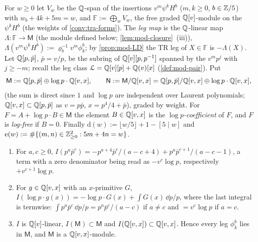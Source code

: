 \begin{defn}
\label{def:mod-weights}
For $w\geq 0$ let $V_w$ be the $\mathbb{Q}$-span of the insertions $v^m\psi^kH^b$ ($m,k\geq 0$, $b\in\mathbb{Z}/5$) with $w_b+4k+5m=w$, and $\mathbb F:=\bigoplus_wV_w$, the free graded $\mathbb{Q}[v]$-module on the $\psi^kH^b$ (the weights of \cref{conv:tra-forms}). The \emph{leg map} is the $\mathbb{Q}$-linear map $\Lambda\colon\mathbb F\to\mathsf M$ (the module defined below; \cref{lem:mod-closure}~(iii)), $\Lambda(v^m\psi^kH^b):=\varrho_b^{-1}v^m\phi^b_k$; by \cref{prop:mod-LD} the TR leg of $X\in\mathbb F$ is $-\Lambda(X)$. Let $\mathbb{Q}[p,\bar p]$, $\bar p=v/p$, be the subring of $\mathbb{Q}[v][p,p^{-1}]$ spanned by the $v^mp^j$ with $j\geq -m$; recall the leg class $\mathcal{L}=\mathbb{Q}[v][p]+\mathbb{Q}(v)[x]$ (\cref{def:mod-pair}). Put
\[
\mathsf M:=\mathbb{Q}[p,\bar p]\oplus\log p\cdot\mathbb{Q}[v,x],\qquad \mathsf N:=\mathsf M/\mathbb{Q}[v,x]=\mathbb{Q}[p,\bar p]/\mathbb{Q}[v,x]\oplus\log p\cdot\mathbb{Q}[v,x],
\]
(the sum is direct since $1$ and $\log p$ are independent over Laurent polynomials; $\mathbb{Q}[v,x]\subset\mathbb{Q}[p,\bar p]$ as $v=p\bar p$, $x=p^4/4+\bar p$), graded by weight. For $F=A+\log p\cdot B\in\mathsf M$ the element $B\in\mathbb{Q}[v,x]$ is the \emph{$\log p$-coefficient} of $F$, and $F$ is \emph{log-free} if $B=0$. Finally $\mathrm d(w):=\lfloor w/5\rfloor+1-[5\mid w]$ and $\mathrm e(w):=\#\{(m,n)\in\mathbb{Z}_{\geq 0}^2: 5m+4n=w\}$.
\end{defn}

\begin{lem}[Closure]
\label{lem:mod-closure}
\begin{enumerate}
\item For $a,c\geq 0$, $I(p^a\bar p^c)=-p^{a+4}\bar p^c/(a-c+4)+p^a\bar p^{c+1}/(a-c-1)$, a term with a zero denominator being read as $-v^c\log p$, respectively $+v^{c+1}\log p$.
\item For $g\in\mathbb{Q}[v,x]$ with an $x$-primitive $G$, $I(\log p\cdot g(x))=-\log p\cdot G(x)+\int G(x)\,\dd p/p$, where the last integral is termwise: $\int p^a\bar p^c\,\dd p/p=p^a\bar p^c/(a-c)$ if $a\neq c$ and $=v^c\log p$ if $a=c$.
\item $I$ is $\mathbb{Q}[v]$-linear, $I(\mathsf M)\subset\mathsf M$ and $I(\mathbb{Q}[v,x])\subset\mathbb{Q}[v,x]$. Hence every leg $\phi^b_k$ lies in $\mathsf M$, and $\mathsf M$ is a $\mathbb{Q}[v,x]$-module.
\end{enumerate}
\end{lem}

